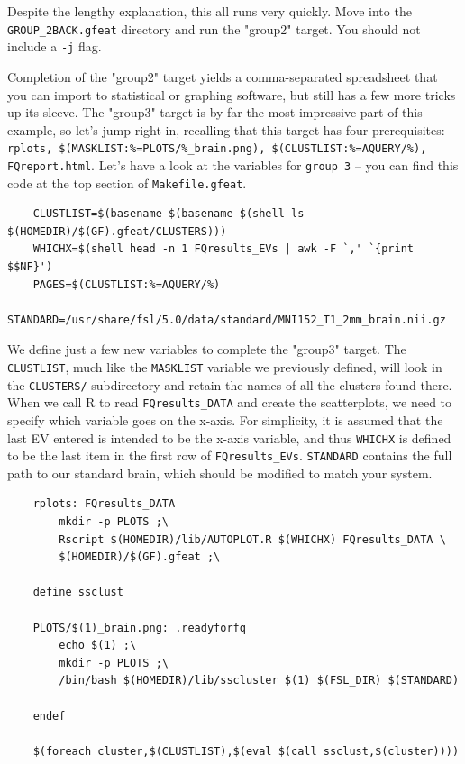 Despite the lengthy explanation, this all runs very quickly. Move into the \texttt{GROUP_2BACK.gfeat} directory and run the "group2" target. You should not include a \texttt{-j} flag.

Completion of the "group2" target yields a comma-separated spreadsheet that you can import to statistical or graphing software, but \maken{} still has a few more tricks up its sleeve. The "group3" target is by far the most impressive part of this example, so let's jump right in, recalling that this target has four prerequisites: \texttt{rplots, \$(MASKLIST:\%=PLOTS/\%_brain.png), \$(CLUSTLIST:\%=AQUERY/\%), FQreport.html}. Let's have a look at the variables for \texttt{group 3} -- you can find this code at the top section of \texttt{Makefile.gfeat}. 

\begin{lstlisting}
	CLUSTLIST=$(basename $(basename $(shell ls $(HOMEDIR)/$(GF).gfeat/CLUSTERS)))
	WHICHX=$(shell head -n 1 FQresults_EVs | awk -F `,' `{print $$NF}')
	PAGES=$(CLUSTLIST:%=AQUERY/%)
	STANDARD=/usr/share/fsl/5.0/data/standard/MNI152_T1_2mm_brain.nii.gz
\end{lstlisting}

We define just a few new variables to complete the "group3" target. The \texttt{CLUSTLIST}, much like the \texttt{MASKLIST} variable we previously defined, will look in the \texttt{CLUSTERS/} subdirectory and retain the names of all the clusters found there. When we call R to read \texttt{FQresults_DATA} and create the scatterplots, we need to specify which variable goes on the x-axis. For simplicity, it is assumed that the last EV entered is intended to be the x-axis variable, and thus \texttt{WHICHX} is defined to be the last item in the first row of \texttt{FQresults_EVs}. \texttt{STANDARD} contains the full path to our standard brain, which should be modified to match your system.

\begin{lstlisting}
	rplots: FQresults_DATA
		mkdir -p PLOTS ;\
		Rscript $(HOMEDIR)/lib/AUTOPLOT.R $(WHICHX) FQresults_DATA \
		$(HOMEDIR)/$(GF).gfeat ;\
		
	define ssclust
	
	PLOTS/$(1)_brain.png: .readyforfq
		echo $(1) ;\
		mkdir -p PLOTS ;\
		/bin/bash $(HOMEDIR)/lib/sscluster $(1) $(FSL_DIR) $(STANDARD)
			
	endef
	
	$(foreach cluster,$(CLUSTLIST),$(eval $(call ssclust,$(cluster))))
\end{lstlisting}

